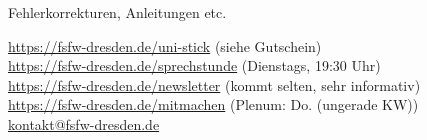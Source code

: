\documentclass[t]{beamer}
\begin{document}
\begin{frame}[label=ct5]{\color{fg}{Weitere Informationen}}
 \vspace{6mm}
 Fehlerkorrekturen, Anleitungen etc.
 \vspace{6mm}

\url{https://fsfw-dresden.de/uni-stick} {\tiny(siehe Gutschein)}\\[3mm]

\url{https://fsfw-dresden.de/sprechstunde} {\tiny(Dienstags, 19:30 Uhr)}\\[3mm]
\url{https://fsfw-dresden.de/newsletter} {\tiny (kommt selten, sehr informativ)}\\[3mm]

\url{https://fsfw-dresden.de/mitmachen} {\tiny(Plenum: Do. (ungerade KW))}\\[3mm]

\url{kontakt@fsfw-dresden.de} \\[3mm]




\end{frame}



%
%
%
%
%
%
%
%
%
%
%
%
\end{document}
